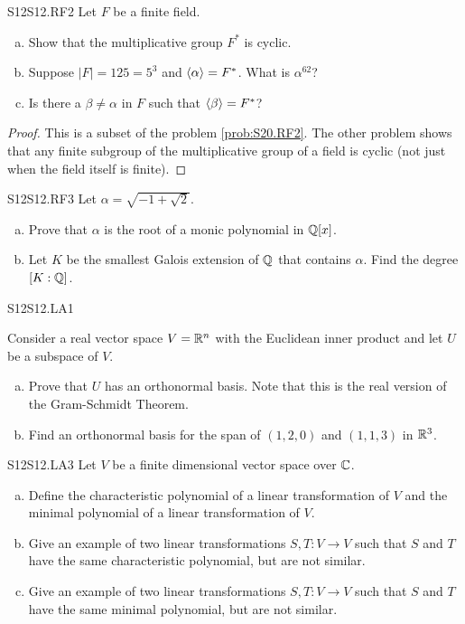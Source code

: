 \documentclass[../AlgebraQualSolutions.tex]{subfiles}
\begin{document}
\begin{prob}{S12}{S12.RF2}
	Let $F$ be a finite field.

	\begin{enumerate}[(a)]
		\item Show that the multiplicative group $F^*$ is cyclic.
		\item Suppose $|F| = 125 = 5^3$ and $\left\langle \alpha \right\rangle = F^*$. What is $\alpha^{62}$?
		\item Is there a $\beta \neq \alpha$ in $F$ such that $\left\langle \beta \right\rangle = F^*$?
	\end{enumerate}
\end{prob}

\begin{proof}
	This is a subset of the problem \ref{prob:S20.RF2}. The other problem shows that any finite subgroup of the multiplicative group of a field is cyclic (not just when the field itself is finite).
\end{proof}

\begin{prob}{S12}{S12.RF3}
	Let $\alpha = \sqrt{-1+\sqrt{2}}$.
	\begin{enumerate}[(a)]
		\item Prove that $\alpha$ is the root of a monic polynomial in $\mathbb{Q}[x]$.
		\item Let $K$ be the smallest Galois extension of $\mathbb{Q}$ that contains $\alpha$. Find the degree $[K: \mathbb{Q}]$.
	\end{enumerate}
\end{prob}

\begin{prob}{S12}{S12.LA1}

	Consider a real vector space $V = \mathbb{R}^n$ with the Euclidean inner product and let $U$ be a subspace of $V$.

	\begin{enumerate}[(a)]
		\item Prove that $U$ has an orthonormal basis. Note that this is the real version of the Gram-Schmidt Theorem.
		\item Find an orthonormal basis for the span of $(1,2,0)$ and $(1,1,3)$ in $\mathbb{R}^3$.
	\end{enumerate}
\end{prob}

\begin{prob}{S12}{S12.LA3}
	Let $V$ be a finite dimensional vector space over $\mathbb{C}$.

	\begin{enumerate}[(a)]
		\item Define the characteristic polynomial of a linear transformation of $V$ and the minimal polynomial of a linear transformation of $V$.
		\item Give an example of two linear transformations $S,T: V \to V$ such that $S$ and $T$ have the same characteristic polynomial, but are not similar.
		\item Give an example of two linear transformations $S,T: V \to V$ such that $S$ and $T$ have the same minimal polynomial, but are not similar.
	\end{enumerate}
\end{prob}
\end{document}
